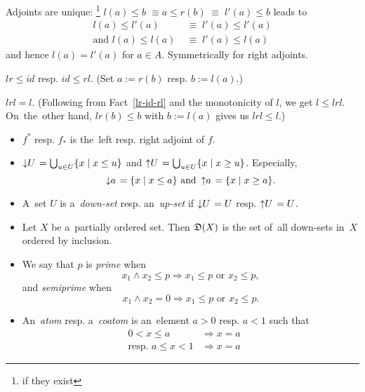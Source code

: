 \begin{rem}
  Adjoints are unique:\thinspace%
  \footnote{if they exist}
  $l(a) \le b \; \equiv a \le r(b) \; \equiv \; l'(a) \le b$ leads to
  \begin{align*}
    l(a) \le l'(a) \; &\equiv \; l'(a) \le l'(a) \\
    \text{and } l(a) \le l(a) \; &\equiv \; l'(a) \le l(a)
  \end{align*}
  and hence $l(a) = l'(a)$ for $a\in A$.
  Symmetrically for right adjoints.
\end{rem}

\begin{fact} \label{lr-id-rl}
  $lr \le id$ resp. $id \le rl$.
  (Set $a := r(b)$ resp. $b := l(a)$.)
\end{fact}

\begin{fact} \label{lrl=l}
  $lrl = l$.
  (Following from Fact~\ref{lr-id-rl} and the monotonicity of $l$, we get $l
   \le lrl$.
  On~the~other hand, $lr(b) \le b$ with $b := l(a)$ gives us $lrl \le l$.)
\end{fact}

\begin{itemize}
\item $f^*$ resp. $f_*$ is the~left resp. right adjoint of $f$.

\item $\left\downarrow U \right. = \bigcup_{u\in U} \{x \mid x \le u\}$ and
$\left\uparrow U \right. = \bigcup_{u\in U} \{x \mid x \ge u\}$.
Especially,
\[
  \left\downarrow a \right. = \{x \mid x \le a\} \text{ and } \left\uparrow a
  \right. = \{x \mid x \ge a\}.
\]

\item A~set $U$ is a~\emph{down-set\/} resp. an~\emph{up-set\/} if
$\left\downarrow U \right. = U$ resp. $\left\uparrow U \right. = U$.

\item Let $X$ be a~partially ordered set.
Then $\mathfrak{D}(X)$ is the set of~all down-sets in~$X$ ordered by inclusion.

\item We say that $p$ is \emph{prime\/} when
\[
  x_1 \wedge x_2 \le p \Rightarrow x_1
  \le p \text{ or } x_2 \le p,
\]
and \emph{semiprime\/} when
\[
  x_1 \wedge x_2 = 0 \Rightarrow
  x_1 \le p \text{ or } x_2 \le p.
\]

\item An~\emph{atom\/} resp. a~\emph{coatom\/} is an~element $a > 0$ resp. $a < 1$
such that
\begin{align*}
  0 < x \le a &\Rightarrow x = a ~~~~~~\\
  \text{resp. } a \le x < 1 &\Rightarrow x = a
\end{align*}

\end{itemize}

